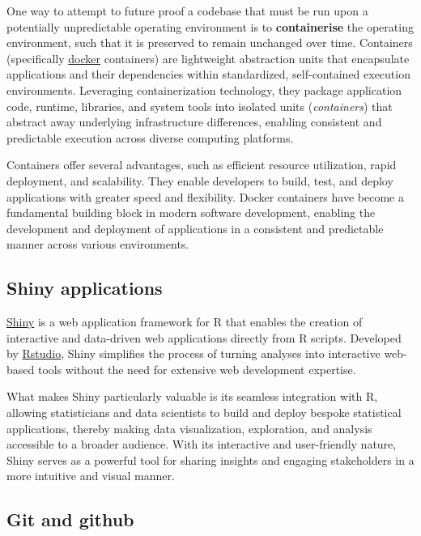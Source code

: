 \documentclass[
  8pt,
  a4paper]{article}
\begin{document}
One way to attempt to future proof a codebase that must be run upon a
potentially unpredictable operating environment is to
\textbf{containerise} the operating environment, such that it is
preserved to remain unchanged over time. Containers (specifically
\href{https://www.docker.com/}{docker} containers) are lightweight
abstraction units that encapsulate applications and their dependencies
within standardized, self-contained execution environments. Leveraging
containerization technology, they package application code, runtime,
libraries, and system tools into isolated units (\emph{containers}) that
abstract away underlying infrastructure differences, enabling consistent
and predictable execution across diverse computing platforms.

Containers offer several advantages, such as efficient resource
utilization, rapid deployment, and scalability. They enable developers
to build, test, and deploy applications with greater speed and
flexibility. Docker containers have become a fundamental building block
in modern software development, enabling the development and deployment
of applications in a consistent and predictable manner across various
environments.

\subsection{Shiny applications}\label{shiny-applications}

\href{https://shiny.posit.co/}{Shiny} is a web application framework for
R that enables the creation of interactive and data-driven web
applications directly from R scripts. Developed by
\href{https://posit.co/}{Rstudio}, Shiny simplifies the process of
turning analyses into interactive web-based tools without the need for
extensive web development expertise.

What makes Shiny particularly valuable is its seamless integration with
R, allowing statisticians and data scientists to build and deploy
bespoke statistical applications, thereby making data visualization,
exploration, and analysis accessible to a broader audience. With its
interactive and user-friendly nature, Shiny serves as a powerful tool
for sharing insights and engaging stakeholders in a more intuitive and
visual manner.

\subsection{Git and github}\label{git-and-github}
\end{document}
